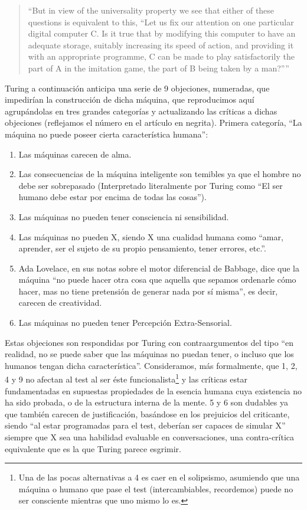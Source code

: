 \documentclass[12pt]{memoir}
\begin{document}
\begin{quotation}
``But in view of the universality property we see that either of these questions is equivalent to this, ``Let us fix our attention on one particular digital computer C. Is it true that by modifying this computer to have an adequate storage, suitably increasing its speed of action, and providing it with an appropriate programme, C can be made to play satisfactorily the part of A in the imitation game, the part of B being taken by a man?'''' \parencite[apartado 5]{Turing1950cmi}
\end{quotation}

Turing a continuación anticipa una serie de 9 objeciones, numeradas, que impedirían la construcción de dicha máquina, que reproducimos aquí agrupándolas en tres grandes categorías y actualizando las críticas a dichas objeciones (reflejamos el número en el artículo en negrita). Primera categoría, ``La máquina no puede poseer cierta característica humana'': 

\begin{enumerate}
    \item[\textbf{1}] Las máquinas carecen de alma.
    \item[\textbf{2}] Las consecuencias de la máquina inteligente son temibles ya que el hombre no debe ser sobrepasado (Interpretado literalmente por Turing como ``El ser humano debe estar por encima de todas las cosas'').
    \item[\textbf{4}] Las máquinas no pueden tener consciencia ni sensibilidad.
    \item[\textbf{5}] Las máquinas no pueden X, siendo X una cualidad humana como ``amar, aprender, ser el sujeto de su propio pensamiento, tener errores, etc.''.
    \item[\textbf{6}] Ada Lovelace, en sus notas sobre el motor diferencial de Babbage, dice que la máquina ``no puede hacer otra cosa que aquella que sepamos ordenarle cómo hacer, mas no tiene pretensión de generar nada por sí misma'', es decir, carecen de creatividad.
    \item[\textbf{9}] Las máquinas no pueden tener Percepción Extra-Sensorial.
\end{enumerate}

Estas objeciones son respondidas por Turing con contraargumentos del tipo ``en realidad, no se puede saber que las máquinas no puedan tener, o incluso que los humanos tengan dicha característica''. Consideramos, más formalmente, que 1, 2, 4 y 9 no afectan al test al ser éste funcionalista\footnote{Una de las pocas alternativas a 4 es caer en el solipsismo, asumiendo que una máquina o humano que pase el test (intercambiables, recordemos) puede no ser consciente mientras que uno mismo lo es.} y las críticas estar fundamentadas en supuestas propiedades de la esencia humana cuya existencia no ha sido probada, o de la estructura interna de la mente. 5 y 6 son dudables ya que también carecen de justificación, basándose en los prejuicios del criticante, siendo ``al estar programadas para el test, deberían ser capaces de simular X'' siempre que X sea una habilidad evaluable en conversaciones, una contra-crítica equivalente que es la que Turing parece esgrimir.
\end{document}
